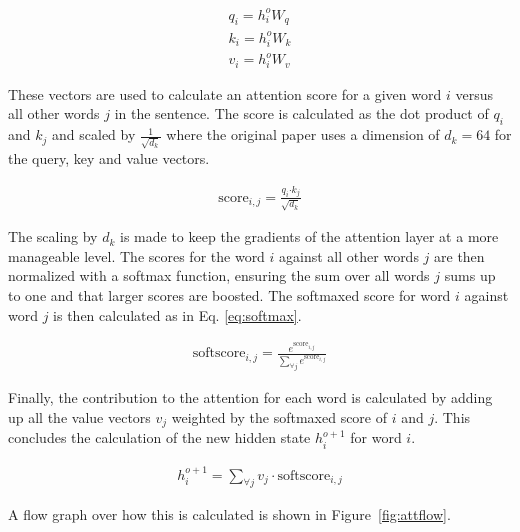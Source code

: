 \begin{align}
    q_i = h_i^o W_q \\
    k_i = h_i^o W_k \\
    v_i = h_i^o W_v 
\end{align}

These vectors are used to calculate an attention score for a given word $i$ versus all other words $j$ in the sentence. The score is calculated as the dot product of $q_i$ and $k_j$ and scaled by $\displaystyle{\frac{1}{\sqrt{d_k}}}$ where the original paper uses a dimension of $d_k=64$ for the query, key and value vectors.

\begin{align}
    \text{score}_{i,j} = \frac{q_i \boldsymbol{\cdot} k_j}{\sqrt{d_k}}
\end{align}

The scaling by $d_k$ is made to keep the gradients of the attention layer at a more manageable level. The scores for the word $i$ against all other words $j$ are then normalized with a softmax function, ensuring the sum over all words $j$ sums up to one and that larger scores are boosted. The softmaxed score for word $i$ against word $j$ is then calculated as in Eq. \ref{eq:softmax}.

\begin{align}
    \text{softscore}_{i,j} = \frac{e^{\text{score}_{i,j}}}{\sum\limits_{\forall j} e^{\text{score}_{i,j}}}
    \label{eq:softmax}
\end{align}

Finally, the contribution to the attention for each word is calculated by adding up all the value vectors $v_j$ weighted by the softmaxed score of $i$ and $j$. This concludes the calculation of the new hidden state $h_i^{o+1}$ for word $i$. 

\begin{align}
    h_i^{o+1} = \sum\limits_{\forall j} v_j \cdot  \text{softscore}_{i,j} 
\end{align}

A flow graph over how this is calculated is shown in Figure~\ref{fig:attflow}. 

